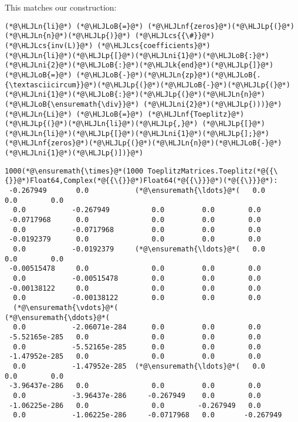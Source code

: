 \documentclass[12pt,a4paper]{article}
\newcommand{\HLJLk}[1]{\textcolor[RGB]{148,91,176}{\textbf{#1}}}
\newcommand{\HLJLn}[1]{#1}
\newcommand{\HLJLnf}[1]{\textcolor[RGB]{66,102,213}{#1}}
\newcommand{\HLJLni}[1]{\textcolor[RGB]{59,151,46}{#1}}
\newcommand{\HLJLoB}[1]{\textcolor[RGB]{102,102,102}{\textbf{#1}}}
\newcommand{\HLJLp}[1]{#1}
\newcommand{\HLJLcs}[1]{\textcolor[RGB]{153,153,119}{\textit{#1}}}
\begin{document}
This matches our construction:


\begin{lstlisting}
(*@\HLJLn{li}@*) (*@\HLJLoB{=}@*) (*@\HLJLnf{zeros}@*)(*@\HLJLp{(}@*)(*@\HLJLn{n}@*)(*@\HLJLp{)}@*) (*@\HLJLcs{{\#}}@*) (*@\HLJLcs{inv(L)}@*) (*@\HLJLcs{coefficients}@*)
(*@\HLJLn{li}@*)(*@\HLJLp{[}@*)(*@\HLJLni{1}@*)(*@\HLJLoB{:}@*)(*@\HLJLni{2}@*)(*@\HLJLoB{:}@*)(*@\HLJLk{end}@*)(*@\HLJLp{]}@*) (*@\HLJLoB{=}@*) (*@\HLJLoB{-}@*)(*@\HLJLn{zp}@*)(*@\HLJLoB{.{\textasciicircum}}@*)(*@\HLJLp{(}@*)(*@\HLJLoB{-}@*)(*@\HLJLp{(}@*)(*@\HLJLni{1}@*)(*@\HLJLoB{:}@*)(*@\HLJLp{(}@*)(*@\HLJLn{n}@*) (*@\HLJLoB{\ensuremath{\div}}@*) (*@\HLJLni{2}@*)(*@\HLJLp{)))}@*)
(*@\HLJLn{Li}@*) (*@\HLJLoB{=}@*) (*@\HLJLnf{Toeplitz}@*)(*@\HLJLp{(}@*)(*@\HLJLn{li}@*)(*@\HLJLp{,}@*) (*@\HLJLp{[}@*)(*@\HLJLn{li}@*)(*@\HLJLp{[}@*)(*@\HLJLni{1}@*)(*@\HLJLp{];}@*) (*@\HLJLnf{zeros}@*)(*@\HLJLp{(}@*)(*@\HLJLn{n}@*)(*@\HLJLoB{-}@*)(*@\HLJLni{1}@*)(*@\HLJLp{)])}@*)
\end{lstlisting}

\begin{lstlisting}
1000(*@\ensuremath{\times}@*(1000 ToeplitzMatrices.Toeplitz(*@{{\{}}@*)Float64,Complex(*@{{\{}}@*)Float64(*@{{\}}}@*)(*@{{\}}}@*):
 -0.267949       0.0           (*@\ensuremath{\ldots}@*(   0.0         0.0        0.0
  0.0           -0.267949          0.0         0.0        0.0
 -0.0717968      0.0               0.0         0.0        0.0
  0.0           -0.0717968         0.0         0.0        0.0
 -0.0192379      0.0               0.0         0.0        0.0
  0.0           -0.0192379     (*@\ensuremath{\ldots}@*(   0.0         0.0        0.0
 -0.00515478     0.0               0.0         0.0        0.0
  0.0           -0.00515478        0.0         0.0        0.0
 -0.00138122     0.0               0.0         0.0        0.0
  0.0           -0.00138122        0.0         0.0        0.0
  (*@\ensuremath{\vdots}@*(                            (*@\ensuremath{\ddots}@*(                         
  0.0           -2.06071e-284      0.0         0.0        0.0
 -5.52165e-285   0.0               0.0         0.0        0.0
  0.0           -5.52165e-285      0.0         0.0        0.0
 -1.47952e-285   0.0               0.0         0.0        0.0
  0.0           -1.47952e-285  (*@\ensuremath{\ldots}@*(   0.0         0.0        0.0
 -3.96437e-286   0.0               0.0         0.0        0.0
  0.0           -3.96437e-286     -0.267949    0.0        0.0
 -1.06225e-286   0.0               0.0        -0.267949   0.0
  0.0           -1.06225e-286     -0.0717968   0.0       -0.267949
\end{lstlisting}
\end{document}
